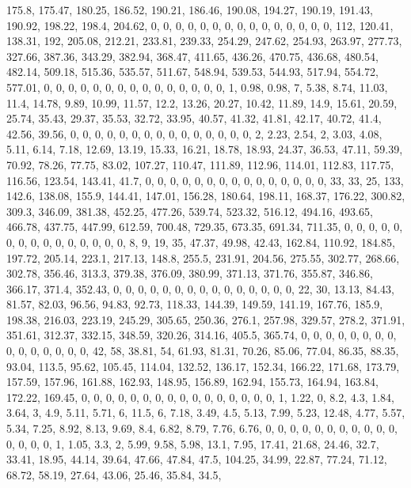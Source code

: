 \documentclass[
]{article}
\begin{document}
175.8, 175.47, 180.25, 186.52, 190.21, 186.46, 190.08, 194.27, 190.19,
191.43, 190.92, 198.22, 198.4, 204.62, 0, 0, 0, 0, 0, 0, 0, 0, 0, 0, 0,
0, 0, 0, 0, 112, 120.41, 138.31, 192, 205.08, 212.21, 233.81, 239.33,
254.29, 247.62, 254.93, 263.97, 277.73, 327.66, 387.36, 343.29, 382.94,
368.47, 411.65, 436.26, 470.75, 436.68, 480.54, 482.14, 509.18, 515.36,
535.57, 511.67, 548.94, 539.53, 544.93, 517.94, 554.72, 577.01, 0, 0, 0,
0, 0, 0, 0, 0, 0, 0, 0, 0, 0, 0, 0, 1, 0.98, 0.98, 7, 5.38, 8.74, 11.03,
11.4, 14.78, 9.89, 10.99, 11.57, 12.2, 13.26, 20.27, 10.42, 11.89, 14.9,
15.61, 20.59, 25.74, 35.43, 29.37, 35.53, 32.72, 33.95, 40.57, 41.32,
41.81, 42.17, 40.72, 41.4, 42.56, 39.56, 0, 0, 0, 0, 0, 0, 0, 0, 0, 0,
0, 0, 0, 0, 0, 2, 2.23, 2.54, 2, 3.03, 4.08, 5.11, 6.14, 7.18, 12.69,
13.19, 15.33, 16.21, 18.78, 18.93, 24.37, 36.53, 47.11, 59.39, 70.92,
78.26, 77.75, 83.02, 107.27, 110.47, 111.89, 112.96, 114.01, 112.83,
117.75, 116.56, 123.54, 143.41, 41.7, 0, 0, 0, 0, 0, 0, 0, 0, 0, 0, 0,
0, 0, 0, 0, 33, 33, 25, 133, 142.6, 138.08, 155.9, 144.41, 147.01,
156.28, 180.64, 198.11, 168.37, 176.22, 300.82, 309.3, 346.09, 381.38,
452.25, 477.26, 539.74, 523.32, 516.12, 494.16, 493.65, 466.78, 437.75,
447.99, 612.59, 700.48, 729.35, 673.35, 691.34, 711.35, 0, 0, 0, 0, 0,
0, 0, 0, 0, 0, 0, 0, 0, 0, 0, 8, 9, 19, 35, 47.37, 49.98, 42.43, 162.84,
110.92, 184.85, 197.72, 205.14, 223.1, 217.13, 148.8, 255.5, 231.91,
204.56, 275.55, 302.77, 268.66, 302.78, 356.46, 313.3, 379.38, 376.09,
380.99, 371.13, 371.76, 355.87, 346.86, 366.17, 371.4, 352.43, 0, 0, 0,
0, 0, 0, 0, 0, 0, 0, 0, 0, 0, 0, 0, 22, 30, 13.13, 84.43, 81.57, 82.03,
96.56, 94.83, 92.73, 118.33, 144.39, 149.59, 141.19, 167.76, 185.9,
198.38, 216.03, 223.19, 245.29, 305.65, 250.36, 276.1, 257.98, 329.57,
278.2, 371.91, 351.61, 312.37, 332.15, 348.59, 320.26, 314.16, 405.5,
365.74, 0, 0, 0, 0, 0, 0, 0, 0, 0, 0, 0, 0, 0, 0, 0, 42, 58, 38.81, 54,
61.93, 81.31, 70.26, 85.06, 77.04, 86.35, 88.35, 93.04, 113.5, 95.62,
105.45, 114.04, 132.52, 136.17, 152.34, 166.22, 171.68, 173.79, 157.59,
157.96, 161.88, 162.93, 148.95, 156.89, 162.94, 155.73, 164.94, 163.84,
172.22, 169.45, 0, 0, 0, 0, 0, 0, 0, 0, 0, 0, 0, 0, 0, 0, 0, 0, 1, 1.22,
0, 8.2, 4.3, 1.84, 3.64, 3, 4.9, 5.11, 5.71, 6, 11.5, 6, 7.18, 3.49,
4.5, 5.13, 7.99, 5.23, 12.48, 4.77, 5.57, 5.34, 7.25, 8.92, 8.13, 9.69,
8.4, 6.82, 8.79, 7.76, 6.76, 0, 0, 0, 0, 0, 0, 0, 0, 0, 0, 0, 0, 0, 0,
0, 1, 1.05, 3.3, 2, 5.99, 9.58, 5.98, 13.1, 7.95, 17.41, 21.68, 24.46,
32.7, 33.41, 18.95, 44.14, 39.64, 47.66, 47.84, 47.5, 104.25, 34.99,
22.87, 77.24, 71.12, 68.72, 58.19, 27.64, 43.06, 25.46, 35.84, 34.5,
\end{document}
